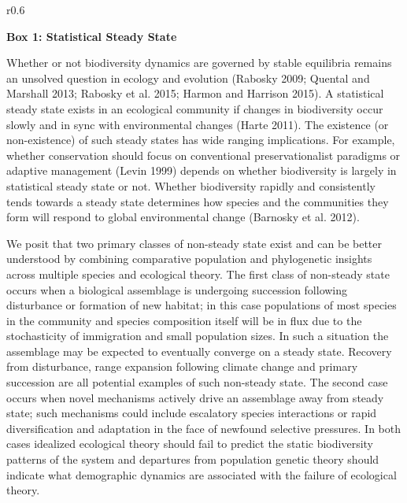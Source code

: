 \documentclass[11pt]{article}
\begin{document}
\begin{wrapfigure}[]{r}{0.6\textwidth}
\colorbox{gray!20}{
  \begin{minipage}{0.6\textwidth}
    \noindent    
    {\bf Box 1: Statistical Steady State}

    Whether or not biodiversity dynamics are governed by stable
    equilibria remains an unsolved question in ecology and evolution
    (Rabosky 2009; Quental and Marshall 2013; Rabosky et al. 2015;
    Harmon and Harrison 2015). A statistical steady state exists in an
    ecological community if changes in biodiversity occur slowly and
    in sync with environmental changes (Harte 2011). The existence (or
    non-existence) of such steady states has wide ranging
    implications. For example, whether conservation should focus on
    conventional preservationalist paradigms or adaptive management
    (Levin 1999) depends on whether biodiversity is largely in
    statistical steady state or not. Whether biodiversity rapidly and
    consistently tends towards a steady state determines how species
    and the communities they form will respond to global environmental
    change (Barnosky et al. 2012).

    We posit that two primary classes of non-steady state exist and
    can be better understood by combining comparative population and
    phylogenetic insights across multiple species and ecological
    theory. The first class of non-steady state occurs when a
    biological assemblage is undergoing succession following
    disturbance or formation of new habitat; in this case populations
    of most species in the community and species composition itself
    will be in flux due to the stochasticity of immigration and small
    population sizes. In such a situation the assemblage may be
    expected to eventually converge on a steady state. Recovery from
    disturbance, range expansion following climate change and primary
    succession are all potential examples of such non-steady
    state. The second case occurs when novel mechanisms actively drive
    an assemblage away from steady state; such mechanisms could
    include escalatory species interactions or rapid diversification
    and adaptation in the face of newfound selective pressures. In
    both cases idealized ecological theory should fail to predict the
    static biodiversity patterns of the system and departures from
    population genetic theory should indicate what demographic
    dynamics are associated with the failure of ecological theory.
  \end{minipage}
}
\end{wrapfigure}
\end{document}
